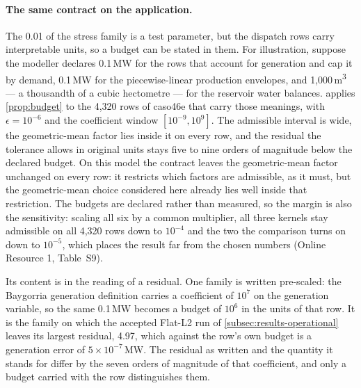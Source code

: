 \documentclass[smallextended,envcountsect,envcountsame]{svjour3}
\begin{document}
\paragraph{The same contract on the application.} The 0.01 of the stress family is a test
parameter, but the dispatch rows carry interpretable units, so a budget can be stated in them.
For illustration, suppose the modeller declares 0.1\,MW for the rows that account for
generation and cap it by demand, 0.1\,MW for the piecewise-linear production envelopes, and 1{,}000\,m\textsuperscript{3}
--- a thousandth of a cubic hectometre --- for the reservoir water balances.
 applies \cref{prop:budget} to the 4,320 rows of caso46e that carry
those meanings, with $\epsilon=10^{-6}$ and the coefficient window $[10^{-9},10^{9}]$. The
admissible interval is wide, the geometric-mean factor lies inside it on every row, and the
residual the tolerance allows in original units stays five to nine orders of magnitude below the
declared budget. On this model the contract leaves the geometric-mean factor unchanged on
every row: it restricts which factors are admissible, as it must, but the geometric-mean choice
considered here already lies well inside that restriction. The budgets are declared rather than
measured, so the margin is also the sensitivity: scaling all six by a common multiplier, all
three kernels stay admissible on all 4,320 rows down to $10^{-4}$ and the two the comparison
turns on down to $10^{-5}$, which places the result far from the chosen numbers (Online Resource 1,
Table~S9).

Its content is in the reading of a residual. One family is written pre-scaled: the Baygorria
generation definition carries a coefficient of $10^7$ on the generation variable, so the same
0.1\,MW becomes a budget of $10^{6}$ in the units of that row. It is the family on which the
accepted Flat-L2 run of \cref{subsec:results-operational} leaves its largest residual, 4.97,
which against the row's own budget is a generation error of $5\times10^{-7}$\,MW. The residual
as written and the quantity it stands for differ by the seven orders of magnitude of that
coefficient, and only a budget carried with the row distinguishes them.
\end{document}
